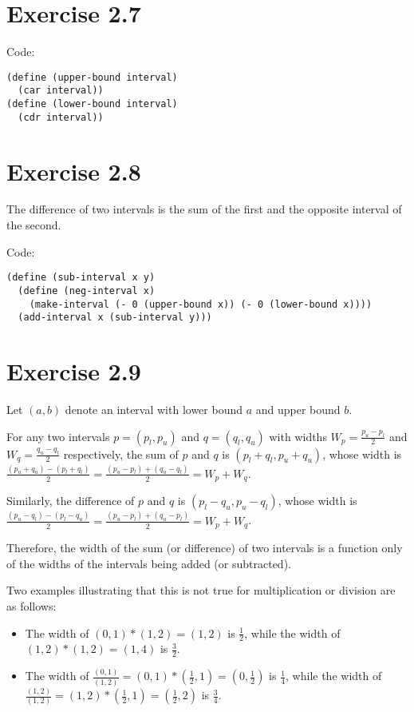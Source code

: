 \documentclass[../main.tex]{subfiles}
\begin{document}
\section{Exercise 2.7}

Code:

\begin{lstlisting}
(define (upper-bound interval)
  (car interval))
(define (lower-bound interval)
  (cdr interval))
\end{lstlisting}

\section{Exercise 2.8}

The difference of two intervals is the
 sum of the first and the opposite interval
 of the second.

Code:

\begin{lstlisting}
(define (sub-interval x y)
  (define (neg-interval x)
    (make-interval (- 0 (upper-bound x)) (- 0 (lower-bound x))))
  (add-interval x (sub-interval y)))
\end{lstlisting}

\section{Exercise 2.9}

Let $(a, b)$ denote an interval with
 lower bound $a$ and upper bound $b$.

For any two intervals $p=(p_l, p_u)$
 and $q=(q_l, q_u)$ with widths $W_p = \frac{p_u - p_l}{2}$
 and $W_q = \frac{q_u - q_l}{2}$
 respectively, the sum of $p$ and $q$ is
 $(p_l + q_l, p_u + q_u)$, whose width is
 $\frac{(p_u + q_u) - (p_l + q_l)}{2} =
 \frac{(p_u - p_l) + (q_u - q_l)}{2} = W_p + W_q$.

Similarly, the difference of $p$ and $q$ is
 $(p_l - q_u, p_u - q_l)$, whose width is
 $\frac{(p_u - q_l) - (p_l - q_u)}{2} = 
 \frac{(p_u - p_l) + (q_u - p_l)}{2} = W_p + W_q$.

Therefore, the width of the sum (or difference) of two
 intervals is a function only of the widths of the intervals
 being added (or subtracted).

Two examples illustrating that this is not true for
 multiplication or division are as follows:

\begin{itemize}
\item The width of $(0, 1) * (1, 2) = (1, 2)$ is $\frac{1}{2}$,
 while the width of $(1, 2) * (1, 2) = (1, 4)$ is $\frac{3}{2}$.
\item The width of $\frac{(0, 1)}{(1, 2)} = (0, 1) *
 (\frac{1}{2}, 1) = (0, \frac{1}{2})$ is $\frac{1}{4}$,
 while the width of $\frac{(1, 2)}{(1, 2)} = (1, 2) *
 (\frac{1}{2}, 1) = (\frac{1}{2}, 2)$ is $\frac{3}{4}$.
\end{itemize}
\end{document}
